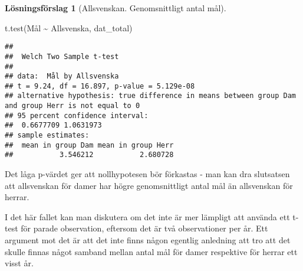 \documentclass[
]{book}
\newenvironment{Shaded}{\begin{snugshade}}{\end{snugshade}}
\newcommand{\FunctionTok}[1]{\textcolor[rgb]{0.00,0.00,0.00}{#1}}
\newcommand{\NormalTok}[1]{#1}
\newcommand{\SpecialCharTok}[1]{\textcolor[rgb]{0.00,0.00,0.00}{#1}}
\theoremstyle{definition}
\theoremstyle{definition}
\theoremstyle{definition}
\theoremstyle{definition}
\newtheorem{hypothesis}{Lösningsförslag}[chapter]
\theoremstyle{remark}
\begin{document}
\begin{hypothesis}[Allsvenskan. Genomsnittligt antal mål]
\begin{Shaded}
\begin{Highlighting}[]
\FunctionTok{t.test}\NormalTok{(Mål }\SpecialCharTok{\textasciitilde{}}\NormalTok{ Allsvenska, dat\_total)}
\end{Highlighting}
\end{Shaded}

\begin{verbatim}
## 
##  Welch Two Sample t-test
## 
## data:  Mål by Allsvenska
## t = 9.24, df = 16.897, p-value = 5.129e-08
## alternative hypothesis: true difference in means between group Dam and group Herr is not equal to 0
## 95 percent confidence interval:
##  0.6677709 1.0631973
## sample estimates:
##  mean in group Dam mean in group Herr 
##           3.546212           2.680728
\end{verbatim}

Det låga p-värdet ger att nollhypotesen bör förkastas - man kan dra slutsatsen att allsvenskan för damer har högre genomsnittligt antal mål än allsvenskan för herrar.

I det här fallet kan man diskutera om det inte är mer lämpligt att använda ett t-test för parade observation, eftersom det är två observationer per år. Ett argument mot det är att det inte finns någon egentlig anledning att tro att det skulle finnas något samband mellan antal mål för damer respektive för herrar ett visst år.
\end{hypothesis}
\end{document}
